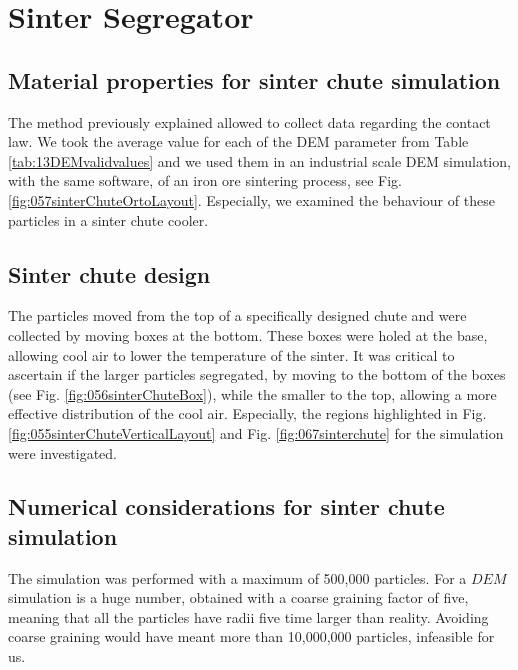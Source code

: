 
\chapter{Sinter Segregator}
\label{cap:sintersegregator}

\section{Material properties for sinter chute simulation}
\label{sec:materialpropertiesforsinterchutesimulation}

The method previously explained allowed to collect data regarding the contact
law. We took the average value for each of the \acs{DEM} parameter from Table
\ref{tab:13DEMvalidvalues} and we used them in an industrial scale \acs{DEM}
simulation, with the same software, of an iron ore sintering process, see Fig. \ref{fig:057sinterChuteOrtoLayout}.
Especially, we examined the behaviour of these particles in a sinter chute cooler. 

\section{Sinter chute design}
\label{sec:sinterchutedesign}

The particles moved from the top of a specifically designed chute and were 
collected by moving boxes at the bottom. These boxes were holed at the base, 
allowing cool air to lower the temperature of the sinter. 
It was critical to ascertain if the larger particles segregated, 
by moving to the bottom of the boxes (see Fig. \ref{fig:056sinterChuteBox}), while the smaller to the top,
allowing a more effective distribution of the cool air. 
Especially, the regions
highlighted in Fig. \ref{fig:055sinterChuteVerticalLayout} and
Fig. \ref{fig:067sinterchute} for the simulation were investigated.

\section{Numerical considerations for sinter chute simulation}
\label{sec:numericalconsiderationsforsinterchutesimulation}

The simulation was performed with a maximum of 500,000 particles.
For a $DEM$ simulation is a huge number, obtained with a coarse graining factor
of five, meaning that all the particles have radii five time larger than reality.
Avoiding coarse graining would have meant more than 10,000,000 particles,
infeasible for us.

